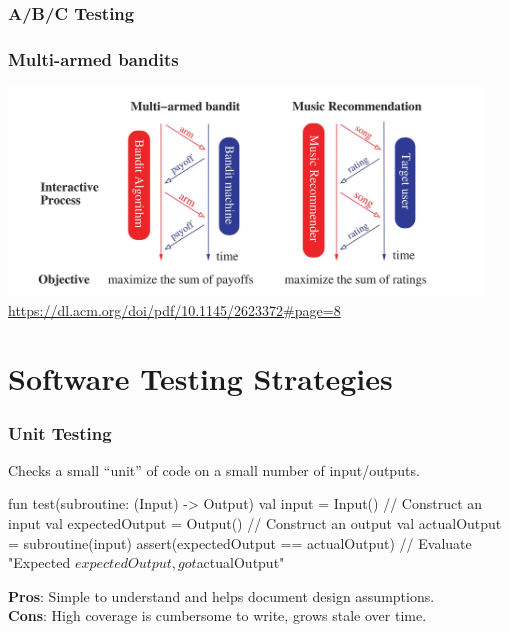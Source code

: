 \documentclass{beamer}
\begin{document}
\begin{frame}
    \frametitle{A/B/C Testing}
    \vspace{-1cm}
    \center{}
\end{frame}


\begin{frame}
    \frametitle{Multi-armed bandits}
    \center\includegraphics[width=0.95\textwidth]{../figures/mab_recommender.jpg}
    \url{https://dl.acm.org/doi/pdf/10.1145/2623372#page=8}
\end{frame}

\section{Software Testing Strategies}

\begin{frame}[fragile]
\frametitle{Unit Testing}
Checks a small ``unit'' of code on a small number of input/outputs.
\begin{kotlinlisting}
fun test(subroutine: (Input) -> Output) {
  val input = Input()           // Construct an input
  val expectedOutput = Output() // Construct an output
  val actualOutput = subroutine(input)
  assert(expectedOutput == actualOutput) { // Evaluate
    "Expected $expectedOutput, got $actualOutput"
  }
}
\end{kotlinlisting}
\textbf{Pros}: Simple to understand and helps document design assumptions.\\
\textbf{Cons}: High coverage is cumbersome to write, grows stale over time.
\end{frame}
\end{document}
